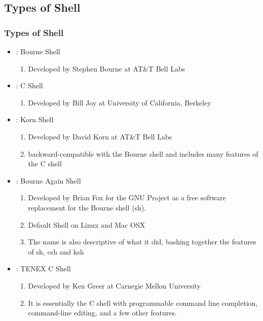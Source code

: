\documentclass[10pt,t]{beamer}
\newcommand*\vardiamond{\textcolor{lubrown}{%
  \ensuremath{\blacklozenge}}}
\begin{document}
\subsection{Types of Shell} 
\begin{frame}
  \frametitle{Types of Shell}
  \begin{itemize}
    \item[\texttt{sh}]: Bourne Shell
      \begin{enumerate}
      \item[$\vardiamond$] Developed by Stephen Bourne at AT\&T Bell Labs
      \end{enumerate}
    \item[\texttt{csh}]: C Shell
      \begin{enumerate}
      \item[$\vardiamond$] Developed by Bill Joy at University of California, Berkeley
      \end{enumerate}
    \item[\texttt{ksh}]: Korn Shell
      \begin{enumerate}
      \item[$\vardiamond$] Developed by David Korn at AT\&T Bell Labs
      \item[$\vardiamond$] backward-compatible with the Bourne shell and includes many features of the C shell
      \end{enumerate}
    \item[\texttt{bash}]: Bourne Again Shell
      \begin{enumerate}
      \item[$\vardiamond$] Developed by Brian Fox for the GNU Project as a free software replacement for the Bourne shell (sh).
      \item[$\vardiamond$] Default Shell on Linux and Mac OSX
      \item[$\vardiamond$] The name is also descriptive of what it did, bashing together the features of sh, csh and ksh
      \end{enumerate}
    \item[\texttt{tcsh}]: TENEX C Shell
      \begin{enumerate}
      \item[$\vardiamond$] Developed by Ken Greer at Carnegie Mellon University 
      \item[$\vardiamond$] It is essentially the C shell with programmable command line completion, command-line editing, and a few other features.
      \end{enumerate}
  \end{itemize}
\end{frame}
\end{document}
